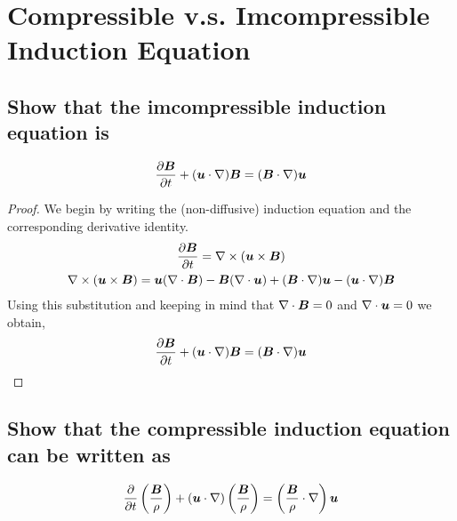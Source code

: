 \documentclass{article}
\begin{document}
\section{Compressible v.s. Imcompressible Induction Equation}

\subsection{Show that the imcompressible induction equation is}
\begin{gather*}
    \frac{\partial \boldsymbol{B}}{\partial t} + (\boldsymbol{u}\cdot\nabla)\boldsymbol{B} = (\boldsymbol{B}\cdot\nabla)\boldsymbol{u}
\end{gather*}

\begin{proof}
    We begin by writing the (non-diffusive) induction equation and the corresponding derivative
    identity. 
    \begin{gather*}
        \frac{\partial \boldsymbol{B}}{\partial t} = \nabla\times(\boldsymbol{u}\times\boldsymbol{B})\\
        \nabla\times(\boldsymbol{u}\times\boldsymbol{B}) = \boldsymbol{u}(\nabla \cdot{\boldsymbol{B}})-\boldsymbol{B}(\nabla \cdot{\boldsymbol{u}}) +
        (\boldsymbol{B}\cdot\nabla)\boldsymbol{u} - (\boldsymbol{u}\cdot\nabla)\boldsymbol{B}
    \end{gather*}
    Using this substitution and keeping in mind that $\nabla \cdot{\boldsymbol{B}} = 0$ and
    $\nabla \cdot{\boldsymbol{u}} = 0$ we obtain, 
    \begin{gather*}
        \frac{\partial \boldsymbol{B}}{\partial t} + (\boldsymbol{u}\cdot\nabla)\boldsymbol{B} = (\boldsymbol{B}\cdot\nabla)\boldsymbol{u}
    \end{gather*}
\end{proof}

\subsection{Show that the compressible induction equation can be written as}
\begin{gather*}
    \frac{\partial }{\partial t}\left(\frac{\boldsymbol{B}}{\rho}\right) +
    (\boldsymbol{u}\cdot\nabla)\left(\frac{\boldsymbol{B}}{\rho}\right) =
    \left(\frac{\boldsymbol{B}}{\rho}\cdot\nabla\right)\boldsymbol{u}
\end{gather*}
\end{document}
